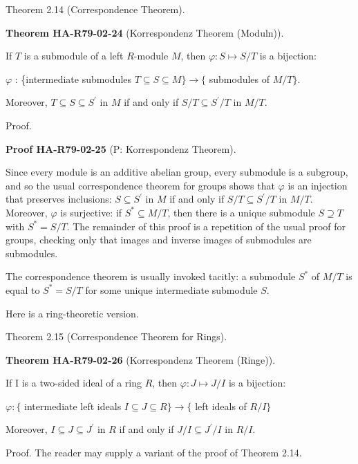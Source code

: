 \documentclass[10pt, letterpaper]{article}
\newcommand{\CustomHeading}[3]{%
  \par\medskip\noindent%
  \textbf{#1 #2} \textnormal{(#3)}.\enskip%
}
\newenvironment{THEO}[2]{\begin{unitbox}\CustomHeading{Theorem}{#1}{#2}}{\end{unitbox}}
\newenvironment{PROOF}[2]{\begin{unitbox}\CustomHeading{Proof}{#1}{#2}}{\end{unitbox}}
\begin{document}
Theorem 2.14 (Correspondence Theorem). 

\begin{THEO}{HA-R79-02-24}{Korrespondenz Theorem (Moduln)}
If $T$ is a submodule of a left $R$-module $M$, then $\varphi: S \mapsto S / T$ is a bijection:

$\varphi$ : \{intermediate submodules $T \subseteq S \subseteq M\} \rightarrow\{$ submodules of $M / T\}$.

Moreover, $T \subseteq S \subseteq S^{\prime}$ in $M$ if and only if $S / T \subseteq S^{\prime} / T$ in $M / T$.
\end{THEO}


Proof. 


\begin{PROOF}{HA-R79-02-25}{P: Korrespondenz Theorem}
Since every module is an additive abelian group, every submodule is a subgroup, and so the usual correspondence theorem for groups shows that $\varphi$ is an injection that preserves inclusions: $S \subseteq S^{\prime}$ in $M$ if and only if $S / T \subseteq S^{\prime} / T$ in $M / T$. Moreover, $\varphi$ is surjective: if $S^{*} \subseteq M / T$, then there is a unique submodule $S \supseteq T$ with $S^{*}=S / T$. The remainder of this proof is a repetition of the usual proof for groups, checking only that images and inverse images of submodules are submodules.
\end{PROOF}



The correspondence theorem is usually invoked tacitly: a submodule $S^{*}$ of $M / T$ is equal to $S^{*}=S / T$ for some unique intermediate submodule $S$.

Here is a ring-theoretic version.

Theorem 2.15 (Correspondence Theorem for Rings). 

\begin{THEO}{HA-R79-02-26}{Korrespondenz Theorem (Ringe)}
If I is a two-sided ideal of a ring $R$, then $\varphi: J \mapsto J / I$ is a bijection:

$\varphi:\{$ intermediate left ideals $I \subseteq J \subseteq R\} \rightarrow\{$ left ideals of $R / I\}$

Moreover, $I \subseteq J \subseteq J^{\prime}$ in $R$ if and only if $J / I \subseteq J^{\prime} / I$ in $R / I$.
\end{THEO}

Proof. The reader may supply a variant of the proof of Theorem 2.14.
\end{document}
